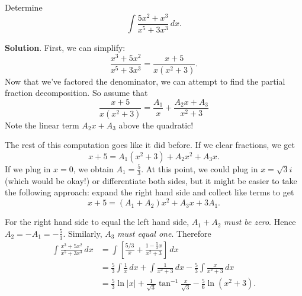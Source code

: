 \documentclass[10pt,]{book}
\theoremstyle{ptxplainnotitle}
\theoremstyle{ptxplaintitle}
\theoremstyle{ptxplainnotitle}
\theoremstyle{ptxplaintitle}
\theoremstyle{ptxplainnotitle}
\theoremstyle{ptxplaintitle}
\theoremstyle{ptxdefinitionnotitle}
\theoremstyle{ptxdefinitiontitle}
\theoremstyle{ptxdefinitionnotitle}
\theoremstyle{ptxdefinitiontitle}
\theoremstyle{ptxdefinitionnotitle}
\theoremstyle{ptxdefinitiontitle}
\theoremstyle{ptxdefinitionnotitle}
\theoremstyle{ptxdefinitiontitle}
\theoremstyle{ptxdefinitionnotitle}
\theoremstyle{ptxdefinitiontitle}
\numberwithin{equation}{section}
\begin{document}
\begin{example}\label{example-partial-fraction-decomposition-with-a-quadratic}
\hypertarget{p-560}{}%
Determine%
\begin{equation*}
\int\frac{5x^{2} + x^{3}}{x^{5} + 3x^{3}}\,dx.
\end{equation*}
%
\par\smallskip%
\noindent\textbf{Solution}.\hypertarget{solution-123}{}\quad%
\hypertarget{p-561}{}%
First, we can simplify:%
\begin{equation*}
\frac{x^{3} + 5x^{2}}{x^{5} + 3x^{3}} = \frac{x + 5}{x(x^{2} + 3)}.
\end{equation*}
Now that we've factored the denominator, we can attempt to find the partial fraction decomposition. So assume that%
\begin{equation*}
\frac{x + 5}{x(x^{2} + 3)} = \frac{A_{1}}{x} + \frac{A_{2}x + A_{3}}{x^{2} + 3}
\end{equation*}
Note the linear term \(A_{2}x + A_{3}\) above the quadratic!%
\par
\hypertarget{p-562}{}%
The rest of this computation goes like it did before. If we clear fractions, we get%
\begin{equation*}
x + 5 = A_{1}(x^{2} + 3) + A_{2}x^{2} + A_{3}x.
\end{equation*}
If we plug in \(x = 0\), we obtain \(A_{1} = \frac{5}{3}\). At this point, we could plug in \(x = \sqrt{3}i\) (which would be okay!) or differentiate both sides, but it might be easier to take the following approach: expand the right hand side and collect like terms to get%
\begin{equation*}
x + 5 = (A_{1} + A_{2})x^{2} + A_{3}x + 3A_{1}.
\end{equation*}
%
\par
\hypertarget{p-563}{}%
For the right hand side to equal the left hand side, \(A_{1} + A_{2}\) \emph{must be zero}. Hence \(A_{2} = -A_{1} = -\frac{5}{3}\). Similarly, \(A_{3}\) \emph{must equal one}. Therefore%
\begin{align*}
\int\frac{x^{3} + 5x^{2}}{x^{5} + 3x^{3}}\,dx & = \int\left[\frac{5/3}{x} + \frac{1 - \frac{5}{3}x}{x^{2} + 3}\right]\,dx \\
& = \frac{5}{3}\int\frac{1}{x}\,dx + \int\frac{1}{x^{2} + 3}\,dx - \frac{5}{3}\int\frac{x}{x^{2} + 3}\,dx \\
& = \frac{5}{3}\ln|x| + \frac{1}{\sqrt{3}}\tan^{-1}\frac{x}{\sqrt{3}} - \frac{5}{6}\ln(x^{2} + 3). 
\end{align*}
%
\end{example}
\end{document}
